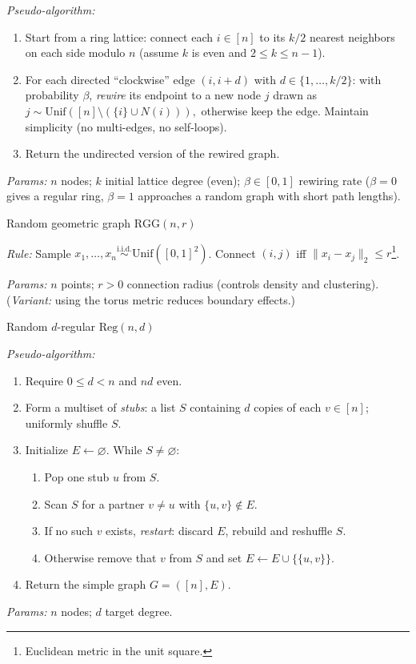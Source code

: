 \documentclass[twoside,11pt]{article}
\numberwithin{equation}{section}
\numberwithin{theorem}{section}
\numberwithin{example}{section}
\begin{document}
\begin{description}
\emph{Pseudo-algorithm:}
\begin{enumerate}
\item Start from a ring lattice: connect each $i\in[n]$ to its $k/2$ nearest neighbors on each side modulo $n$ (assume $k$ is even and $2\le k\le n-1$).
\item For each directed “clockwise” edge $(i,i+d)$ with $d\in\{1,\dots,k/2\}$:
  with probability $\beta$, \emph{rewire} its endpoint to a new node $j$ drawn as
  \(
  j\sim \mathrm{Unif}\left([n]\setminus\left(\{i\}\cup N(i)\right)\right),
  \)
  otherwise keep the edge. Maintain simplicity (no multi-edges, no self-loops).
\item Return the undirected version of the rewired graph.
\end{enumerate}
\emph{Params:} $n$ nodes; $k$ initial lattice degree (even); $\beta\in[0,1]$ rewiring rate
($\beta=0$ gives a regular ring, $\beta=1$ approaches a random graph with short path lengths).

\item[]\textsf{Random geometric graph} $\mathrm{RGG}(n,r)$

\emph{Rule:} Sample $x_1,\dots,x_n \overset{\text{i.i.d.}}{\sim}\mathrm{Unif}([0,1]^2)$.
Connect $(i,j)$ iff $\|x_i-x_j\|_2 \le r$\footnote{Euclidean metric in the unit square.}.

\emph{Params:} $n$ points; $r>0$ connection radius (controls density and clustering). (\emph{Variant:} using the torus metric reduces boundary effects.)

\item[]\textsf{Random $d$-regular} $\mathrm{Reg}(n,d)$

 \emph{Pseudo-algorithm:}
 \begin{enumerate}
 \item Require $0\le d<n$ and $nd$ even.
 \item Form a multiset of \emph{stubs}: a list $S$ containing $d$ copies of each $v\in[n]$; uniformly shuffle $S$.
 \item Initialize $E\gets\varnothing$. While $S\neq\varnothing$:
   \begin{enumerate}
     \item Pop one stub $u$ from $S$.
     \item Scan $S$ for a partner $v\neq u$ with $\{u,v\}\notin E$.
     \item If no such $v$ exists, \emph{restart}: discard $E$, rebuild and reshuffle $S$.
     \item Otherwise remove that $v$ from $S$ and set $E\gets E\cup\{\{u,v\}\}$.
   \end{enumerate}
 \item Return the simple graph $G=([n],E)$.
 \end{enumerate}
 \emph{Params:} $n$ nodes; $d$ target degree.


\end{description}
\end{document}
